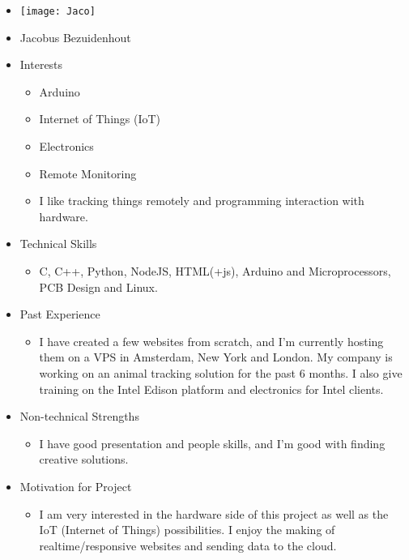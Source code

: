 
\begin{itemize}
	\item[] \texttt{[image: Jaco]}
	\item[] Jacobus Bezuidenhout
	\item Interests
	\begin{itemize}
		\item Arduino
		\item Internet of Things (IoT)
		\item Electronics
		\item Remote Monitoring
		\item I like tracking things remotely and programming interaction with hardware.
	\end{itemize}
	\item Technical Skills
	\begin{itemize}
		\item[] C, C++, Python, NodeJS, HTML(+js), Arduino and Microprocessors, PCB Design and Linux.
	\end{itemize}
	\item Past Experience
	\begin{itemize}
		\item[] I have created a few websites from scratch, and I'm currently hosting them on a VPS in Amsterdam, New York and London. My company is working on an animal tracking solution for the past 6 months. I also give training on the Intel Edison platform and electronics for Intel clients.
	\end{itemize}
	\item Non-technical Strengths
	\begin{itemize}
		\item[] I have good presentation and people skills, and I'm good with finding creative solutions.
	\end{itemize}
	\item Motivation for Project
	\begin{itemize}
		\item[] I am very interested in the hardware side of this project as well as the IoT (Internet of Things) possibilities. I enjoy the making of realtime/responsive websites and sending data to the cloud.
	\end{itemize}
\end{itemize}